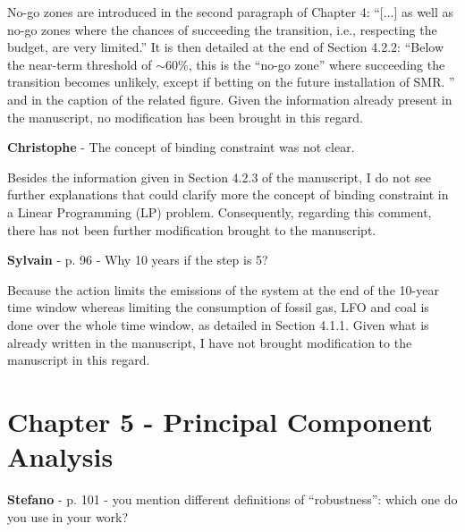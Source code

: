 \documentclass[12pt,a4paper]{article}
\begin{document}
\noindent No-go zones are introduced in the second paragraph of Chapter 4: ``[...] as well as no-go zones where the chances of succeeding the transition, i.e., respecting the  budget, are very limited.'' It is then detailed at the end of Section 4.2.2: ``Below the near-term threshold of $\sim$60\%, this is the ``no-go zone'' where succeeding the transition becomes unlikely, except
if betting on the future installation of SMR. '' and in the caption of the related figure. Given the information already present in the manuscript, no modification has been brought in this regard.

\begin{mdframed}[style=comment] %
{\color{violet} \textbf{Christophe}} - The concept of binding constraint was not clear.
\end{mdframed}

\noindent
Besides the information given in Section 4.2.3 of the manuscript, I do not see further explanations that could clarify more the concept of binding constraint in a Linear Programming (LP) problem. Consequently, regarding this comment, there has not been further modification brought to the manuscript.

\begin{mdframed}[style=comment] %
{\color{purple} \textbf{Sylvain}} - p. 96 - Why 10 years if the step is 5?
\end{mdframed}

\noindent Because the action limits the emissions of the system at the end of the 10-year time window whereas limiting the consumption of fossil gas, LFO and coal is done over the whole time window, as detailed in Section 4.1.1. Given what is already written in the manuscript, I have not brought modification to the manuscript in this regard.

\section{Chapter 5 - Principal Component Analysis}
\label{PCA}

\begin{mdframed}[style=comment] %
{\color{orange} \textbf{Stefano}} - p. 101 - you mention different definitions of ``robustness'': which one do you use in your work?
\end{mdframed}
\end{document}
